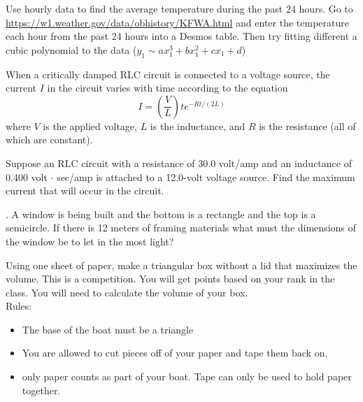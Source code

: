 \documentclass[11pt]{exam}
\begin{document}
	\begin{questions}
		
		\addpoints
		
		\question[15]
		Use hourly data to find the average temperature during the past 24 hours.
		Go to \url{https://w1.weather.gov/data/obhistory/KFWA.html} and enter the temperature each hour from the past 24 hours into a Desmos table.  Then try fitting different a cubic polynomial to the data ($y_1 \sim ax_1^3 + bx_1^2 + cx_1 + d$)
		
		\question[5]
		When a critically damped RLC circuit is connected to a voltage source, the current $I$ in the circuit varies with time according to the equation
		\[I = \left(\frac{V}{L}\right)te^{-Rt/(2L)}\]
		where $V$ is the applied voltage, $L$ is the inductance, and $R$ is the resistance (all of which are constant).
		
		Suppose an RLC circuit with a resistance of 30.0 volt/amp and an inductance of 0.400 volt $\cdot$ sec/amp is attached to a 12.0-volt voltage source. Find the maximum current that will occur in the circuit.
			
		.	A window is being built and the bottom is a rectangle and the top is a semicircle. If there is 12 meters of framing materials what must the dimensions of the window be to let in the most light?
		
		\question[5] Using one sheet of paper, make a triangular box without a lid that maximizes the volume.  This is a competition.  You will get points based on your rank in the class.  You will need to calculate the volume of your box.\\
		
		Rules:
		\begin{itemize}
			\item The base of the boat must be a triangle
			\item You are allowed to cut pieces off of your paper and tape them back on.
			\item only paper counts as part of your boat.  Tape can only be used to hold paper together.
		\end{itemize}
		
		
	\end{questions}
	
\end{document}

